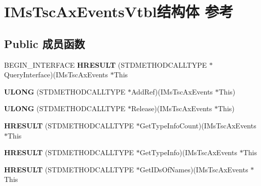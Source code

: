 \hypertarget{struct_i_ms_tsc_ax_events_vtbl}{}\section{I\+Ms\+Tsc\+Ax\+Events\+Vtbl结构体 参考}
\label{struct_i_ms_tsc_ax_events_vtbl}
\subsection*{Public 成员函数}
\begin{DoxyCompactItemize}
\item 
\mbox{\label{struct_i_ms_tsc_ax_events_vtbl_a735a32525d4f7fcb8f51600a5813d290}} 
B\+E\+G\+I\+N\+\_\+\+I\+N\+T\+E\+R\+F\+A\+CE {\bfseries H\+R\+E\+S\+U\+LT} (S\+T\+D\+M\+E\+T\+H\+O\+D\+C\+A\+L\+L\+T\+Y\+PE $\ast$Query\+Interface)(I\+Ms\+Tsc\+Ax\+Events $\ast$This
\item 
\mbox{\label{struct_i_ms_tsc_ax_events_vtbl_aa4ed551da38cabba93d5e6f91ca6ba16}} 
{\bfseries U\+L\+O\+NG} (S\+T\+D\+M\+E\+T\+H\+O\+D\+C\+A\+L\+L\+T\+Y\+PE $\ast$Add\+Ref)(I\+Ms\+Tsc\+Ax\+Events $\ast$This)
\item 
\mbox{\label{struct_i_ms_tsc_ax_events_vtbl_a607399f38e958c5f6b5b88daa78f4e45}} 
{\bfseries U\+L\+O\+NG} (S\+T\+D\+M\+E\+T\+H\+O\+D\+C\+A\+L\+L\+T\+Y\+PE $\ast$Release)(I\+Ms\+Tsc\+Ax\+Events $\ast$This)
\item 
\mbox{\label{struct_i_ms_tsc_ax_events_vtbl_a934e19afacb3f7ea608cb6a525ca27e2}} 
{\bfseries H\+R\+E\+S\+U\+LT} (S\+T\+D\+M\+E\+T\+H\+O\+D\+C\+A\+L\+L\+T\+Y\+PE $\ast$Get\+Type\+Info\+Count)(I\+Ms\+Tsc\+Ax\+Events $\ast$This
\item 
\mbox{\label{struct_i_ms_tsc_ax_events_vtbl_a8872ad7b15c39e654aee1142544dc9c4}} 
{\bfseries H\+R\+E\+S\+U\+LT} (S\+T\+D\+M\+E\+T\+H\+O\+D\+C\+A\+L\+L\+T\+Y\+PE $\ast$Get\+Type\+Info)(I\+Ms\+Tsc\+Ax\+Events $\ast$This
\item 
\mbox{\label{struct_i_ms_tsc_ax_events_vtbl_ad90b45c84cd591db5c21f229de2ae220}} 
{\bfseries H\+R\+E\+S\+U\+LT} (S\+T\+D\+M\+E\+T\+H\+O\+D\+C\+A\+L\+L\+T\+Y\+PE $\ast$Get\+I\+Ds\+Of\+Names)(I\+Ms\+Tsc\+Ax\+Events $\ast$This

\end{DoxyCompactItemize}
